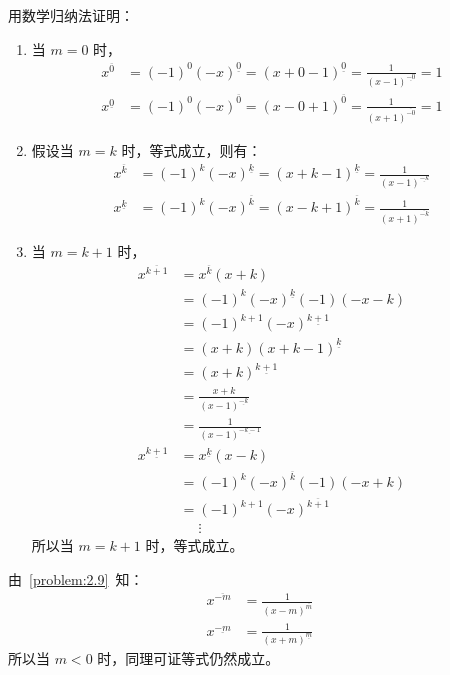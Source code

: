 用数学归纳法证明：
\begin{enumerate}
  \item 当 \( m = 0 \) 时，
    \begin{align*}
      x^{\overline{0}} &= (-1)^0 (-x)^{\underline{0}} = (x + 0 - 1)^{\underline{0}} = \frac{1}{(x - 1)^{\underline{-0}}} = 1 \\
      x^{\underline{0}} &= (-1)^0 (-x)^{\overline{0}} = (x - 0 + 1)^{\overline{0}} = \frac{1}{(x + 1)^{\overline{-0}}} = 1
    \end{align*}
  \item 假设当 \( m = k \) 时，等式成立，则有：
    \begin{align*}
      x^{\overline{k}} &= (-1)^k (-x)^{\underline{k}} = (x + k - 1)^{\underline{k}} = \frac{1}{(x - 1)^{\underline{-k}}} \\
      x^{\underline{k}} &= (-1)^k (-x)^{\overline{k}} = (x - k + 1)^{\overline{k}} = \frac{1}{(x + 1)^{\overline{-k}}}
    \end{align*}
  \item 当 \( m = k + 1 \) 时，
    \begin{align*}
      x^{\overline{k+1}} &= x^{\overline{k}} (x + k) \\
      &= (-1)^k (-x)^{\underline{k}} (-1) (-x - k) \\
      &= (-1)^{k+1} (-x)^{\underline{k+1}} \\
      &= (x + k) (x + k - 1)^{\underline{k}} \\
      &= (x + k)^{\underline{k+1}} \\
      &= \frac{x + k}{(x - 1)^{\underline{-k}}} \\
      &= \frac{1}{(x - 1)^{\underline{-k - 1}}} \\
      x^{\underline{k+1}} &= x^{\underline{k}} (x - k) \\
      &= (-1)^k (-x)^{\overline{k}} (-1) (-x + k) \\
      &= (-1)^{k+1} (-x)^{\overline{k+1}} \\
      &\phantom{=} \vdots
    \end{align*}
    所以当 \( m = k + 1 \) 时，等式成立。
\end{enumerate}

由~\ref{problem:2.9}~知：
\begin{align*}
  x^{\overline{-m}} &= \frac{1}{(x - m)^{\overline{m}}} \\
  x^{\underline{-m}} &= \frac{1}{(x + m)^{\underline{m}}}
\end{align*}
所以当 \( m < 0 \) 时，同理可证等式仍然成立。

